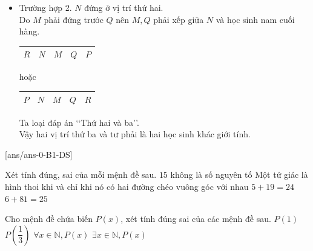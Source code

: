 \begin{ex}
{\begin{itemize}
\begin{itemize}
\begin{center}
\begin{tabular}{|c|c|c|c|c|}
						\hline
					\end{tabular}
				\end{center}							
				Ta loại đáp án \lq\lq Thứ ba và năm\rq\rq.
			\end{itemize}
			\item Trường hợp 2. $N$ đứng ở vị trí thứ hai.\\
			Do $M$ phải đứng trước $Q$ nên $M,Q$ phải xếp giữa $N$ và học sinh nam cuối hàng. 
			\begin{center}
				\begin{tabular}{|c|c|c|c|c|}
					\hline
					$R$ & $N$ & $M$ & $Q$ & $P$ \\
					\hline
				\end{tabular} hoặc \begin{tabular}{|c|c|c|c|c|}
					\hline
					$P$ & $N$ & $M$ & $Q$ & $R$ \\
					\hline
				\end{tabular}
			\end{center}			
			Ta loại đáp án \lq\lq Thứ hai và ba\rq\rq.\\
			Vậy hai vị trí thứ ba và tư phải là hai học sinh khác giới tính.
		\end{itemize}
	}
\end{ex}	
\cauds
{}[ans/ans-0-B1-DS]
\begin{ex}%
	Xét tính đúng, sai của mỗi mệnh đề sau.
	\choiceTF
	{$15$ không là số nguyên tố}
	{Một tứ giác là hình thoi khi và chỉ khi nó có hai đường chéo vuông góc với nhau}
	{\True$5+19=24$}
	{$6+81=25$}
\end{ex}
\begin{ex}%
	Cho mệnh đề chứa biến $P(x)$, xét tính đúng sai của các mệnh đề sau.
	\choiceTF
	{$P(1)$}
	{\True$P\left(\dfrac{1}{3} \right)$}
	{$\forall x\in \mathbb{N},P(x)$}
	{\True$\exists x\in \mathbb{N},P(x)$}
\end{ex}
